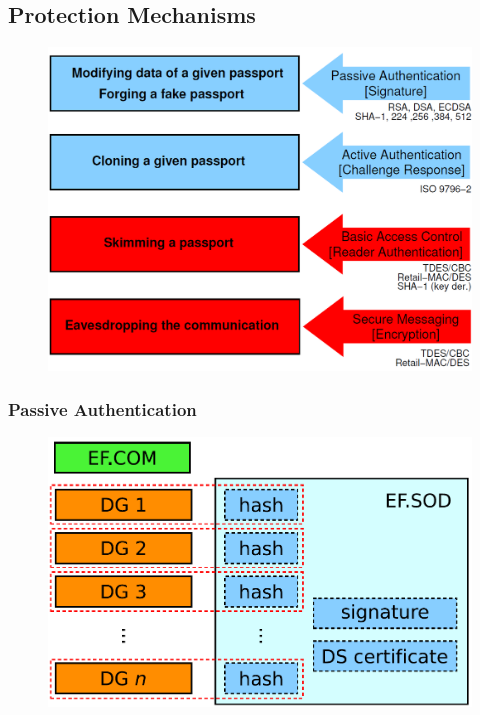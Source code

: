 \subsection{Protection Mechanisms}
\begin{figure}[ht!]
    \centering
    \includegraphics[scale=0.5]{img/e-passport}
\end{figure}

\subsubsection{Passive Authentication}
\begin{figure}[ht!]
    \centering
    \includegraphics[scale=0.5]{img/passive-authentication}
\end{figure}

